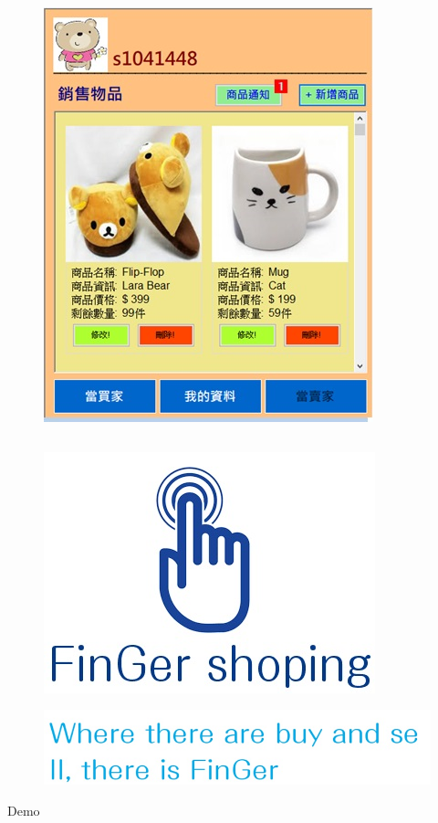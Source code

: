 \documentclass{beamer}
\begin{document}
\begin{CJK}{UTF8}{bsmi}
\begin{frame}
\begin{columns}[c]

\begin{figure}
\includegraphics[width=0.6\linewidth]{note.jpg}
\end{figure}

\end{columns}

\end{frame}


\begin{frame}
\begin{figure}
\includegraphics[width=0.3\linewidth]{logo.jpg}
\end{figure}
\begin{figure}
\includegraphics[width=0.7\linewidth]{good.jpg}
\end{figure}
\end{frame}








\begin{frame}
\Huge{\centerline{Demo}}
\end{frame}

\end{CJK}
\end{document}
